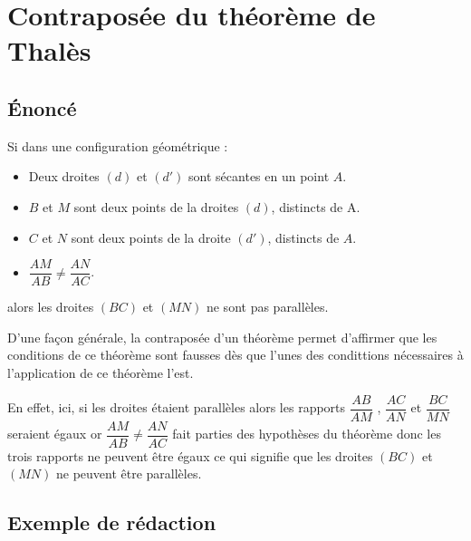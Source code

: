 \section{Contraposée du théorème de Thalès}
    \subsection{Énoncé}
        \begin{theoreme}[\admis]
            Si dans une configuration géométrique :
            \begin{itemize}
                \item Deux droites $(d)$ et $(d')$ sont sécantes en un point $A$.
                \item $B$ et $M$ sont deux points de la droites $(d)$, distincts de A.
                \item $C$ et $N$ sont deux points de la droite $(d')$, distincts de $A$.
                \item $\dfrac{AM}{AB} \neq \dfrac{AN}{AC}$.       
            \end{itemize}
            \medskip
            alors les droites $(BC)$ et $(MN)$ ne sont pas parallèles.
        \end{theoreme}

        \begin{remarque}
            D'une façon générale, la contraposée d'un théorème permet d'affirmer que les conditions
            de ce théorème sont fausses dès que l'unes des condittions nécessaires à l'application de ce théorème l'est.

            En effet, ici, si les droites étaient parallèles alors les rapports $\dfrac{AB}{AM}$ , $\dfrac{AC}{AN}$ et $\dfrac{BC}{MN}$ seraient égaux
            or $\dfrac{AM}{AB} \neq \dfrac{AN}{AC}$ fait parties des hypothèses du théorème donc les trois rapports ne peuvent 
            être égaux ce qui signifie que les droites $(BC)$ et $(MN)$ ne peuvent être parallèles.
        \end{remarque}
    
    \subsection{Exemple de rédaction}

